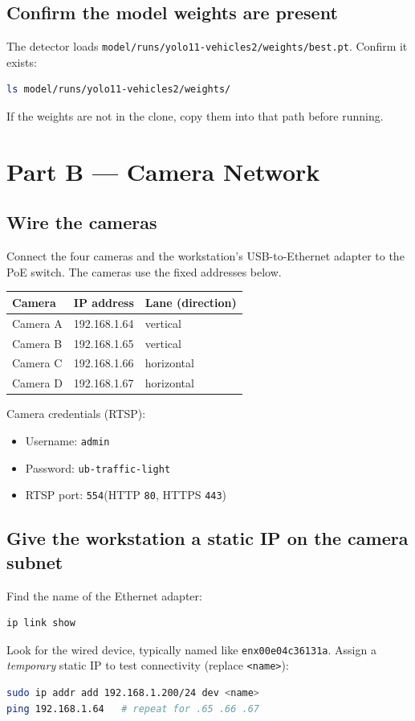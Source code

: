 \documentclass[11pt]{article}
\newcommand{\code}[1]{\texttt{#1}}
\begin{document}
\subsection{Confirm the model weights are present}
The detector loads \code{model/runs/yolo11-vehicles2/weights/best.pt}. Confirm
it exists:
\begin{lstlisting}[language=bash]
ls model/runs/yolo11-vehicles2/weights/
\end{lstlisting}
If the weights are not in the clone, copy them into that path before running.

\section{Part B --- Camera Network}

\subsection{Wire the cameras}
Connect the four cameras and the workstation's USB-to-Ethernet adapter to the
PoE switch. The cameras use the fixed addresses below.

\begin{table}[h]
\centering
\begin{tabular}{@{}lll@{}}
\toprule
\textbf{Camera} & \textbf{IP address} & \textbf{Lane (direction)} \\
\midrule
Camera A & 192.168.1.64 & vertical \\
Camera B & 192.168.1.65 & vertical \\
Camera C & 192.168.1.66 & horizontal \\
Camera D & 192.168.1.67 & horizontal \\
\bottomrule
\end{tabular}
\end{table}

\noindent Camera credentials (RTSP):
\begin{itemize}[nosep]
  \item Username: \code{admin}
  \item Password: \code{ub-traffic-light}
  \item RTSP port: \code{554}\quad(HTTP \code{80}, HTTPS \code{443})
\end{itemize}

\subsection{Give the workstation a static IP on the camera subnet}
Find the name of the Ethernet adapter:
\begin{lstlisting}[language=bash]
ip link show
\end{lstlisting}
Look for the wired device, typically named like \code{enx00e04c36131a}. Assign a
\emph{temporary} static IP to test connectivity (replace \code{<name>}):
\begin{lstlisting}[language=bash]
sudo ip addr add 192.168.1.200/24 dev <name>
ping 192.168.1.64   # repeat for .65 .66 .67
\end{lstlisting}
\end{document}
